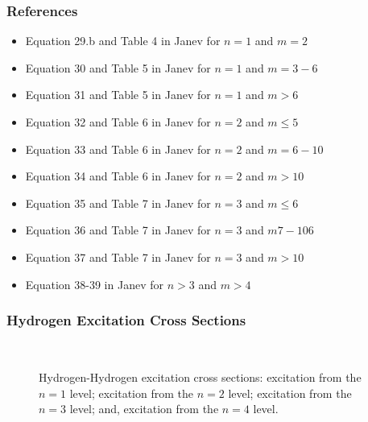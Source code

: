 \subsubsection{References}
\begin{itemize}
    \item Equation 29.b and Table 4 in Janev\cite{janev2003collision} for $n=1$ and $m=2$
    \item Equation 30 and Table 5 in Janev\cite{janev2003collision} for $n=1$ and $m=3-6$
    \item Equation 31 and Table 5 in Janev\cite{janev2003collision} for $n=1$ and $m>6$
    \item Equation 32 and Table 6 in Janev\cite{janev2003collision} for $n=2$ and $m\le5$
    \item Equation 33 and Table 6 in Janev\cite{janev2003collision} for $n=2$ and $m=6-10$
    \item Equation 34 and Table 6 in Janev\cite{janev2003collision} for $n=2$ and $m>10$
    \item Equation 35 and Table 7 in Janev\cite{janev2003collision} for $n=3$ and $m\le6$
    \item Equation 36 and Table 7 in Janev\cite{janev2003collision} for $n=3$ and $m7-106$
    \item Equation 37 and Table 7 in Janev\cite{janev2003collision} for $n=3$ and $m>10$
    \item Equation 38-39 in Janev\cite{janev2003collision} for $n>3$ and $m>4$
\end{itemize}
\newpage
\subsubsection{Hydrogen Excitation Cross Sections}
\begin{figure}[h!]%
    \centering
    \hspace{8pt}
     \\
    \hspace{8pt}
    \caption{Hydrogen-Hydrogen excitation cross sections:
         excitation from the $n=1$ level;
         excitation from the $n=2$ level;
         excitation from the $n=3$ level; and,
         excitation from the $n=4$ level.}
    \label{fig:H_H_EX}
\end{figure}
\newpage
